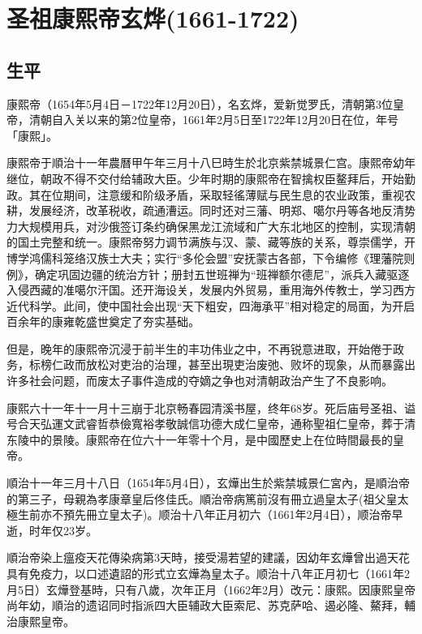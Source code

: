 
\section{圣祖康熙帝玄烨\tiny(1661-1722)}

\subsection{生平}

康熙帝（1654年5月4日－1722年12月20日），名玄烨，爱新觉罗氏，清朝第3位皇帝，清朝自入关以来的第2位皇帝，1661年2月5日至1722年12月20日在位，年号「康熙」。

康熙帝于順治十一年農曆甲午年三月十八巳時生於北京紫禁城景仁宫。康熙帝幼年继位，朝政不得不交付给辅政大臣。少年时期的康熙帝在智擒权臣鳌拜后，开始勤政。其在位期间，注意缓和阶级矛盾，采取轻徭薄赋与民生息的农业政策，重视农耕，发展经济，改革税收，疏通漕运。同时还对三藩、明郑、噶尔丹等各地反清势力大规模用兵，对沙俄签订条约确保黑龙江流域和广大东北地区的控制，实现清朝的国土完整和统一。康熙帝努力调节满族与汉、蒙、藏等族的关系，尊崇儒学，开博学鸿儒科笼络汉族士大夫；实行“多伦会盟”安抚蒙古各部，下令编修《理藩院则例》，确定巩固边疆的统治方针；册封五世班禅为“班禅额尔德尼”，派兵入藏驱逐入侵西藏的准噶尔汗国。还开海设关，发展内外贸易，重用海外传教士，学习西方近代科学。此间，使中国社会出现“天下粗安，四海承平”相对稳定的局面，为开启百余年的康雍乾盛世奠定了夯实基础。

但是，晚年的康熙帝沉浸于前半生的丰功伟业之中，不再锐意进取，开始倦于政务，标榜仁政而放松对吏治的治理，甚至出現吏治废弛、败坏的现象，从而暴露出许多社会问题，而废太子事件造成的夺嫡之争也对清朝政治产生了不良影响。

康熙六十一年十一月十三崩于北京畅春园清溪书屋，终年68岁。死后庙号圣祖、谥号合天弘運文武睿哲恭儉寬裕孝敬誠信功德大成仁皇帝，通称聖祖仁皇帝，葬于清东陵中的景陵。康熙帝在位六十一年零十个月，是中國歷史上在位時間最長的皇帝。

順治十一年三月十八日（1654年5月4日），玄燁出生於紫禁城景仁宮內，是順治帝的第三子，母親為孝康章皇后佟佳氏。順治帝病篤前沒有冊立過皇太子(祖父皇太極生前亦不預先冊立皇太子)。顺治十八年正月初六（1661年2月4日），顺治帝早逝，时年仅23岁。

順治帝染上瘟疫天花傳染病第3天時，接受湯若望的建議，因幼年玄燁曾出過天花具有免疫力，以口述遺詔的形式立玄燁為皇太子。顺治十八年正月初七（1661年2月5日）玄燁登基時，只有八歲，次年正月（1662年2月）改元：康熙。因康熙皇帝尚年幼，順治的遗诏同时指派四大臣辅政大臣索尼、苏克萨哈、遏必隆、鰲拜，輔治康熙皇帝。

